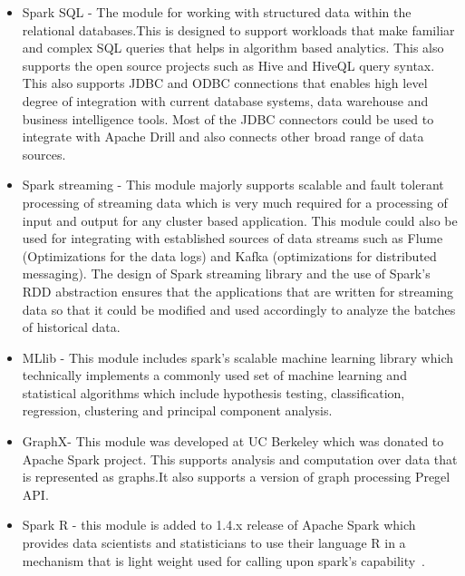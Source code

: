\begin{itemize}

\item Spark SQL - The module for working with structured data within the relational 
databases.This is designed to support workloads that make familiar and complex 
SQL queries that helps in algorithm based analytics. This also supports the open
 source projects such as Hive and HiveQL query syntax. This also supports JDBC 
 and ODBC connections that enables high level degree of integration with current
  database systems, data warehouse and business intelligence tools. Most of the 
  JDBC connectors could be used to integrate with Apache Drill and also connects
   other broad range of data sources.

\item Spark streaming - This module majorly supports scalable and fault tolerant 
processing of streaming data which is very much required for a processing of 
input and output for any cluster based application. This module could also be 
used for integrating with established sources of data streams such as Flume 
(Optimizations for the data logs) and Kafka (optimizations for distributed 
messaging). The design of Spark streaming library and the use of Spark’s RDD 
abstraction ensures that the applications that are written for streaming data 
so that it could be modified and used accordingly to analyze the batches of 
historical data.

\item MLlib - This module includes spark’s scalable machine learning library which 
technically implements a commonly used set of machine learning and statistical 
algorithms which include hypothesis testing, classification, regression, 
clustering and principal component analysis.

\item GraphX- This module was developed at UC Berkeley which was donated to Apache 
Spark project. This supports analysis and computation over data that is 
represented as graphs.It also supports a version of graph processing Pregel API.

\item Spark R - this module is added to 1.4.x release of Apache Spark which provides 
data scientists and statisticians to use their language R in a mechanism that is
 light weight used for calling upon spark’s capability~\cite{hid-sp18-410-spark-architecture}.

\end{itemize}


